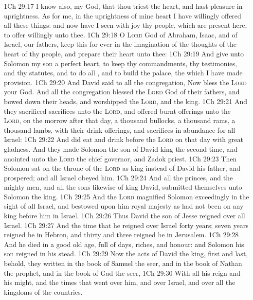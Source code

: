 \vs 1Ch 29:17 I know also, my God, that thou triest the heart, and hast pleasure in uprightness. As for me, in the uprightness of mine heart I have willingly offered all these things: and now have I seen with joy thy people, which are present here, to offer willingly unto thee.
\vs 1Ch 29:18 O \textsc{Lord} God of Abraham, Isaac, and of Israel, our fathers, keep this for ever in the imagination of the thoughts of the heart of thy people, and prepare their heart unto thee:
\vs 1Ch 29:19 And give unto Solomon my son a perfect heart, to keep thy commandments, thy testimonies, and thy statutes, and to do all , and to build the palace,  the which I have made provision.
\vs 1Ch 29:20 And David said to all the congregation, Now bless the \textsc{Lord} your God. And all the congregation blessed the \textsc{Lord} God of their fathers, and bowed down their heads, and worshipped the \textsc{Lord}, and the king.
\vs 1Ch 29:21 And they sacrificed sacrifices unto the \textsc{Lord}, and offered burnt offerings unto the \textsc{Lord}, on the morrow after that day,  a thousand bullocks, a thousand rams,  a thousand lambs, with their drink offerings, and sacrifices in abundance for all Israel:
\vs 1Ch 29:22 And did eat and drink before the \textsc{Lord} on that day with great gladness. And they made Solomon the son of David king the second time, and anointed  unto the \textsc{Lord}  the chief governor, and Zadok  priest.
\vs 1Ch 29:23 Then Solomon sat on the throne of the \textsc{Lord} as king instead of David his father, and prospered; and all Israel obeyed him.
\vs 1Ch 29:24 And all the princes, and the mighty men, and all the sons likewise of king David, submitted themselves unto Solomon the king.
\vs 1Ch 29:25 And the \textsc{Lord} magnified Solomon exceedingly in the sight of all Israel, and bestowed upon him  royal majesty as had not been on any king before him in Israel.
\vs 1Ch 29:26 Thus David the son of Jesse reigned over all Israel.
\vs 1Ch 29:27 And the time that he reigned over Israel  forty years; seven years reigned he in Hebron, and thirty and three  reigned he in Jerusalem.
\vs 1Ch 29:28 And he died in a good old age, full of days, riches, and honour: and Solomon his son reigned in his stead.
\vs 1Ch 29:29 Now the acts of David the king, first and last, behold, they  written in the book of Samuel the seer, and in the book of Nathan the prophet, and in the book of Gad the seer,
\vs 1Ch 29:30 With all his reign and his might, and the times that went over him, and over Israel, and over all the kingdoms of the countries.
